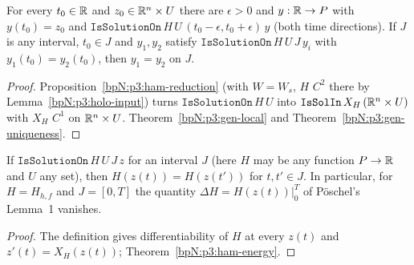 \begin{theorem}\label{bpN:p3:local-exist}
For every $t_0\in\mathbb{R}$ and $z_0\in\mathbb{R}^n\times U$ there are $\epsilon>0$ and $y:\mathbb{R}\to P$ with $y(t_0)=z_0$ and
$\texttt{IsSolutionOn}\,H\,U\,(t_0-\epsilon,t_0+\epsilon)\,y$ (both time directions). If $J$ is any interval, $t_0\in J$ and
$y_1,y_2$ satisfy $\texttt{IsSolutionOn}\,H\,U\,J\,y_i$ with $y_1(t_0)=y_2(t_0)$, then $y_1=y_2$ on $J$.
\end{theorem}
\begin{proof}
\label{stepN:p3:le-red} Proposition~\ref{bpN:p3:ham-reduction} (with $W=W_s$, $H$ $C^2$ there by Lemma~\ref{bpN:p3:holo-input}) turns $\texttt{IsSolutionOn}\,H\,U$ into $\texttt{IsSolIn}\,X_H\,(\mathbb{R}^n\times U)$ with $X_H$ $C^1$ on $\mathbb{R}^n\times U$.
\label{stepN:p3:le-apply} Theorem~\ref{bpN:p3:gen-local} and Theorem~\ref{bpN:p3:gen-uniqueness}.
\end{proof}

\begin{theorem}\label{bpN:p3:energy}
If $\texttt{IsSolutionOn}\,H\,U\,J\,z$ for an interval $J$ (here $H$ may be any function $P\to\mathbb{R}$ and $U$ any set), then $H(z(t))=H(z(t'))$ for $t,t'\in J$.
In particular, for $H=H_{h,f}$ and $J=[0,T]$ the quantity $\Delta H=H(z(t))|_0^T$ of P\"oschel's Lemma~1 vanishes.
\end{theorem}
\begin{proof}
\label{stepN:p3:en-direct} The definition gives differentiability of $H$ at every $z(t)$ and $z'(t)=X_H(z(t))$; Theorem~\ref{bpN:p3:ham-energy}.
\end{proof}

